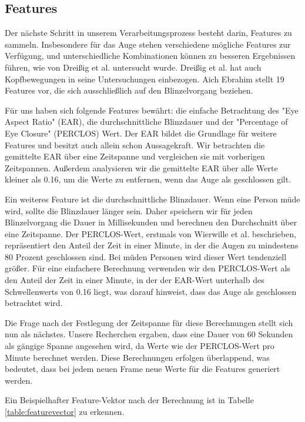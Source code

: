 \subsection{Features}
\label{sec:features}

Der nächste Schritt in unserem Verarbeitungsprozess besteht darin, Features zu sammeln. Insbesondere für das Auge stehen verschiedene mögliche Features zur Verfügung, und unterschiedliche Kombinationen können zu besseren Ergebnissen führen, wie von Dreißig et al. \cite{DREI} untersucht wurde. Dreißig et al. hat auch Kopfbewegungen in seine Untersuchungen einbezogen. Aich Ebrahim \cite{EB16} stellt 19 Features vor, die sich ausschließlich auf den Blinzelvorgang beziehen.

Für uns haben sich folgende Features bewährt: die einfache Betrachtung des "Eye Aspect Ratio" (EAR), die durchschnittliche Blinzdauer und der "Percentage of Eye Closure" (PERCLOS) Wert. Der EAR bildet die Grundlage für weitere Features und besitzt auch allein schon Aussagekraft. Wir betrachten die gemittelte EAR über eine Zeitspanne und vergleichen sie mit vorherigen Zeitspannen. Außerdem analysieren wir die gemittelte EAR über alle Werte kleiner als 0.16, um die Werte zu entfernen, wenn das Auge als geschlossen gilt.

Ein weiteres Feature ist die durchschnittliche Blinzdauer. Wenn eine Person müde wird, sollte die Blinzdauer länger sein. Daher speichern wir für jeden Blinzelvorgang die Dauer in Millisekunden und berechnen den Durchschnitt über eine Zeitspanne.
Der PERCLOS-Wert, erstmals von Wierwille et al. \cite{WI94} beschrieben, repräsentiert den Anteil der Zeit in einer Minute, in der die Augen zu mindestens 80 Prozent geschlossen sind. Bei müden Personen wird dieser Wert tendenziell größer. Für eine einfachere Berechnung verwenden wir den PERCLOS-Wert als den Anteil der Zeit in einer Minute, in der der EAR-Wert unterhalb des Schwellenwerts von 0.16 liegt, was darauf hinweist, dass das Auge als geschlossen betrachtet wird.

Die Frage nach der Festlegung der Zeitspanne für diese Berechnungen stellt sich nun als nächstes. Unsere Recherchen ergaben, dass eine Dauer von 60 Sekunden als gängige Spanne angesehen wird, da Werte wie der PERCLOS-Wert pro Minute berechnet werden. Diese Berechnungen erfolgen überlappend, was bedeutet, dass bei jedem neuen Frame neue Werte für die Features generiert werden.

Ein Beispielhafter Feature-Vektor nach der Berechnung ist in Tabelle \ref{table:featurevector} zu erkennen.

